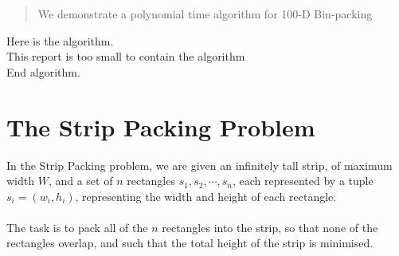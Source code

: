 \documentclass{article}
\begin{document}
\begin{abstract}
We demonstrate a polynomial time algorithm for 100-D Bin-packing
\end{abstract}

Here is the algorithm. \\
This report is too small to contain the algorithm \\
End algorithm. \\

\section{The Strip Packing Problem}
In the Strip Packing problem, we are given an infinitely tall strip, of maximum width $W$, and a set of $n$ rectangles $s_1,s_2,\cdots,s_n$, each represented by a tuple $s_i = (w_i,h_i)$, representing the width and height of each rectangle.\\
\\
The task is to pack all of the $n$ rectangles into the strip, so that none of the rectangles overlap, and such that the total height of the strip is minimised.\\
\\
\end{document}
